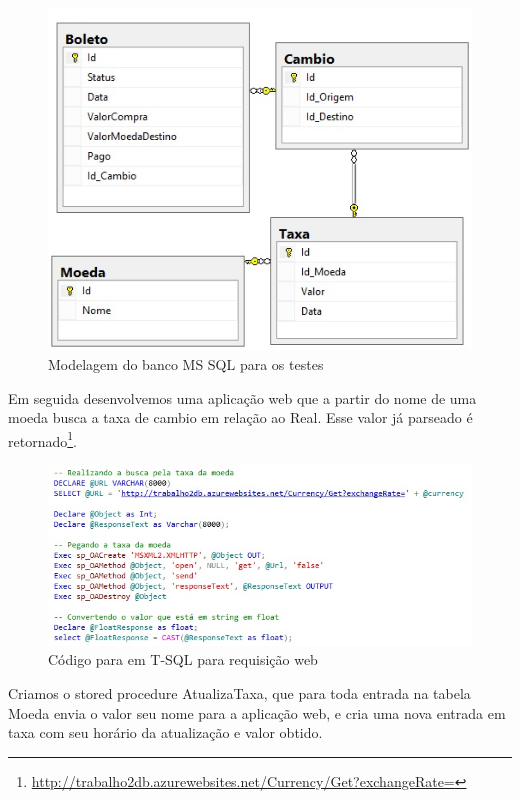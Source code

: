 \documentclass[conference]{IEEEtran}
\begin{document}
    \begin{figure}[!t]
      \centering
      \includegraphics[scale=0.65]{img/tabela.jpg}
      \caption{Modelagem do banco MS SQL para os testes}
    \end{figure}

  	Em seguida desenvolvemos uma aplicação web que a partir do nome de uma moeda busca a taxa de cambio em relação ao Real. Esse valor já parseado é retornado\footnote{\href{http://trabalho2db.azurewebsites.net/Currency/Get?exchangeRate=}{http://trabalho2db.azurewebsites.net/Currency/Get?exchangeRate=}}.

\begin{figure}[!t]
      \centering
  	  \includegraphics[scale=0.65]{img/requisicao.jpg}
      \caption{Código para em T-SQL para requisição web}
    \end{figure}

  	Criamos o stored procedure AtualizaTaxa, que para toda entrada na tabela Moeda envia o valor seu nome para a aplicação web, e cria uma nova entrada em taxa com seu horário da atualização e valor obtido.
\end{document}
